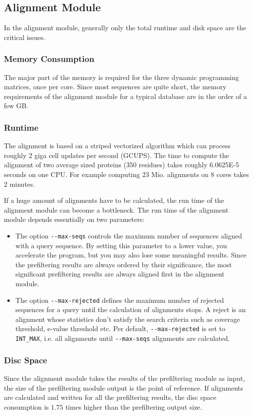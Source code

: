 \documentclass[11pt,a4paper]{scrreprt}
\begin{document}
\subsection{Alignment Module}
In the alignment module, generally only the total runtime and disk space are the critical issues.
\subsubsection{Memory Consumption}
The major part of the memory is required for the three dynamic programming matrices, once per core. Since most sequences are quite short, the memory requirements of the alignment module for a typical database are in the order of a few GB. 
\subsubsection{Runtime}
The alignment is based on a striped vectorized algorithm which can process roughly 2 giga cell updates per second (GCUPS). The time to compute the alignment of two average sized proteins (350 residues) takes roughly 6.0625E-5 seconds on one CPU. For example computing 23 Mio. alignments on 8 cores takes 2 minutes. 

If a huge amount of alignments have to be calculated, the run time of the alignment module can become a bottleneck. The run time of the alignment module depends essentially on two parameters:
\begin{itemize}
\item The option \texttt{-{}-max-seqs} controls the maximum number of sequences aligned with a query sequence. By setting this parameter to a lower value, you accelerate the program, but you may also lose some meaningful results. Since the prefiltering results are always ordered by their significance, the most significant prefiltering results are always aligned first in the alignment module.
\item The option \texttt{-{}-max-rejected} defines the maximum number of rejected sequences for a query until the calculation of alignments stops. A reject is an alignment whose statistics don't satisfy the search criteria such as coverage threshold, e-value threshold etc. Per default, \texttt{-{}-max-rejected} is set to \texttt{INT\_MAX}, i.e. all alignments until \texttt{-{}-max-seqs} alignments are calculated.
\end{itemize}
\subsubsection{Disc Space}
Since the alignment module takes the results of the prefiltering module as input, the size of the prefiltering module output is the point of reference. If alignments are calculated and written for all the prefiltering results, the disc space consumption is $1.75$ times higher than the prefiltering output size.
\end{document}

